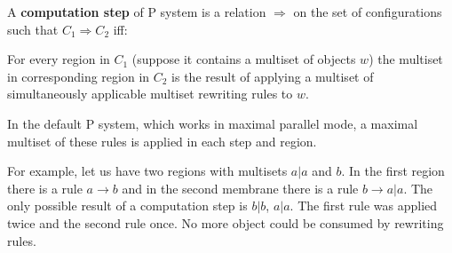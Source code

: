 A {\bf computation step} of P system is a relation $\Rightarrow$ on the set of configurations such that $C_1 \Rightarrow C_2$ iff:

For every region in $C_1$ (suppose it contains a multiset of objects $w$) the multiset in corresponding region in $C_2$ is the result of applying a multiset of simultaneously applicable multiset rewriting rules to $w$.

In the default P system, which works in maximal parallel mode, a maximal multiset of these rules is applied in each step and region.

For example, let us have two regions with multisets $a|a$ and $b$. In the first region there is a rule $a\rightarrow b$ and in the second membrane there is a rule $b\rightarrow a|a$. The only possible result of a computation step is $b|b$, $a|a$. The first rule was applied twice and the second rule once. No more object could be consumed by rewriting rules.
